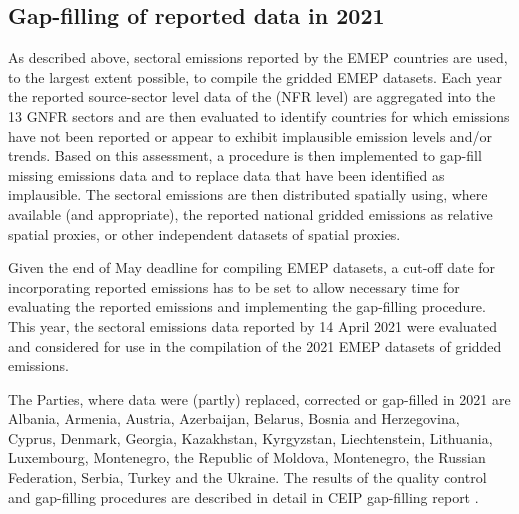 \subsection{Gap-filling of reported data in 2021}
\label{sec:gapfilling}

As described above, sectoral emissions reported by the EMEP countries are used, to the largest extent possible, to compile the gridded EMEP datasets. Each year the reported source-sector level data of the (NFR level) are aggregated into the 13 GNFR sectors and are then evaluated to identify countries for which emissions have not been reported or appear to exhibit implausible emission levels and/or trends. Based on this assessment, a procedure is then implemented to gap-fill missing emissions data and to replace data that have been identified as implausible. The sectoral emissions are then distributed spatially using, where available (and appropriate), the reported national gridded emissions as relative spatial proxies, or other independent datasets of spatial proxies.

Given the end of May deadline for compiling EMEP datasets, a cut-off date for incorporating reported emissions has to be set to allow necessary time for evaluating the reported emissions and implementing the gap-filling procedure. This year, the sectoral emissions data reported by 14 April 2021 were evaluated and considered for use in the compilation of the 2021 EMEP datasets of gridded emissions.

The Parties, where data were (partly) replaced, corrected or gap-filled in 2021 are Albania, Armenia, Austria, Azerbaijan, Belarus, Bosnia and Herzegovina, Cyprus, Denmark, Georgia, Kazakhstan, Kyrgyzstan, Liechtenstein, Lithuania, Luxembourg,  Montenegro, the Republic of Moldova, Montenegro, the Russian Federation, Serbia, Turkey and the Ukraine. The results of the quality control and gap-filling procedures are described in detail in CEIP gap-filling report \citep{CEIP2021c}. %

